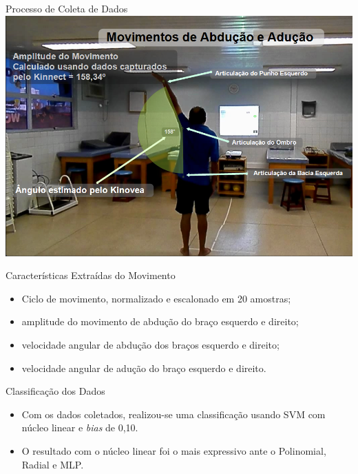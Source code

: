 \documentclass{beamer}
\begin{document}
\begin{frame}{Processo de Coleta de Dados}
      \center \includegraphics[height=2.6 in]{img/capturaducaokinnect.png}
\end{frame}

\begin{frame}{Características Extraídas do Movimento}
	\begin{block}{}
		\begin{itemize}[<+->]
			\item	Ciclo de movimento, normalizado e escalonado em 20 amostras;
			\item	amplitude do movimento de abdução do braço esquerdo e direito;
			\item	velocidade angular de abdução dos braços esquerdo e direito;
			\item velocidade angular de adução do braço esquerdo e direito.
		\end{itemize}
	\end{block}
\end{frame}

\begin{frame}{Classificação dos Dados}
	\begin{block}{}
		\begin{itemize}[<+->]
			\item	Com os dados coletados, realizou-se uma classificação usando SVM com núcleo linear e \textit{bias} de 0,10.
			\item	O resultado com o núcleo linear foi o mais expressivo ante o Polinomial, Radial e MLP.
		\end{itemize}
	\end{block}
\end{frame}
\end{document}
